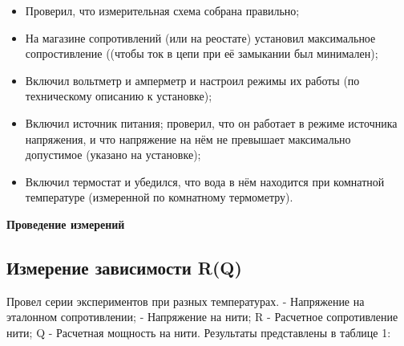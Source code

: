\hspace{1.2cm}\begin{minipage}[t]{15cm}
\begin{itemize}
    \item Проверил, что измерительная схема собрана правильно;
    
    \item На магазине сопротивлений (или на реостате) установил максимальное сопростивление  ((чтобы ток в цепи при её замыкании был минимален);
    
    \item Включил вольтметр и амперметр и настроил режимы их работы (по техническому описанию к установке);

    \item Включил источник питания; проверил, что он работает в режиме источника напряжения, и что напряжение на нём не превышает максимально допустимое (указано на установке);
    
    \item Включил термостат и убедился, что вода в нём находится при комнатной температуре (измеренной по комнатному термометру).
    
\end{itemize}
\end{minipage}

\newpage

\begin{center}
    {\Large\bf Проведение измерений}
\end{center}

\subsection{Измерение зависимости R(Q)}
Провел серии экспериментов при разных температурах.  - Напряжение на эталонном сопротивлении;  - Напряжение на нити; R - Расчетное сопротивление нити; Q - Расчетная мощность на нити. Результаты представлены в таблице 1:

